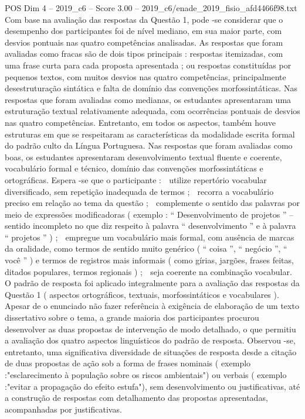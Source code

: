\begin{textsample}{POS Dim 4 – 2019\_c6 – Score 3.00 – 2019\_c6/enade\_2019\_fisio\_afd4466f98.txt}
Com base na avaliação das respostas da Questão 1, pode -se considerar que o desempenho dos participantes foi de nível mediano, em sua maior parte, com desvios pontuais nas quatro competências analisadas.
As respostas que foram avaliadas como fracas são de dois tipos principais : respostas itemizadas, com uma frase curta para cada proposta apresentada ; ou respostas constituídas por pequenos textos, com muitos desvios nas quatro competências, principalmente desestruturação sintática e falta de domínio das convenções morfossintáticas.
Nas respostas que foram avaliadas como medianas, os estudantes apresentaram uma estruturação textual relativamente adequada, com ocorrências pontuais de desvios nas quatro competências.
Entretanto, em todos os aspectos, também houve estruturas em que se respeitaram as características da modalidade escrita formal do padrão culto da Língua Portuguesa.
Nas respostas que foram avaliadas como boas, os estudantes apresentaram desenvolvimento textual fluente e coerente, vocabulário formal e técnico, domínio das convenções morfossintáticas e ortográficas.
Espera -se que o participante :  utilize repertório vocabular diversificado, sem repetição inadequada de termos ;  recorra a vocabulário preciso em relação ao tema da questão ;  complemente o sentido das palavras por meio de expressões modificadoras ( exemplo : “ Desenvolvimento de projetos ” – sentido incompleto no que diz respeito à palavra “ desenvolvimento ” e à palavra “ projetos ” ) ;  empregue um vocabulário mais formal, com ausência de marcas da oralidade, como termos de sentido muito genérico ( “ coisa ”, “ negócio ”, “ você ” ) e termos de registros mais informais ( como gírias, jargões, frases feitas, ditados populares, termos regionais ) ;  seja coerente na combinação vocabular.
O padrão de resposta foi aplicado integralmente para a avaliação das respostas da Questão 1 ( aspectos ortográficos, textuais, morfossintáticos e vocabulares ).
Apesar de o enunciado não fazer referência à exigência de elaboração de um texto dissertativo sobre o tema, a grande maioria dos participantes procurou desenvolver as duas propostas de intervenção de modo detalhado, o que permitiu a avaliação dos quatro aspectos linguísticos do padrão de resposta.
Observou -se, entretanto, uma significativa diversidade de situações de resposta desde a citação de duas propostas de ação sob a forma de frases nominais ( exemplo :"esclarecimento à população sobre os riscos ambientais") ou verbais ( exemplo :"evitar a propagação do efeito estufa"), sem desenvolvimento ou justificativas, até a construção de respostas com detalhamento das propostas apresentadas, acompanhadas por justificativas.

\end{textsample}
